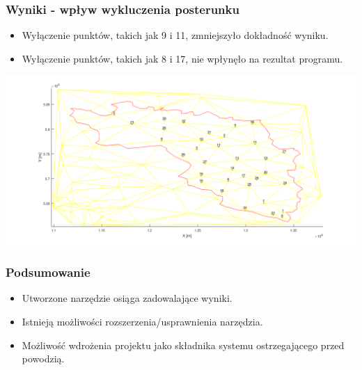 \documentclass{beamer}
\begin{document}
\begin{frame}
\frametitle{Wyniki - wpływ wykluczenia posterunku}
\begin{itemize}
\item{Wyłączenie punktów, takich jak 9 i 11, zmniejszyło dokładność wyniku.}
\item{Wyłączenie punktów, takich jak 8 i 17, nie wpłynęło na rezultat programu.}
\end{itemize}
\centering
\includegraphics[width=.8\textwidth]{./../img/identyfikatory_punktow.png}

\end{frame}


\begin{frame}
\frametitle{Podsumowanie}
\begin{itemize}
	\item{Utworzone narzędzie osiąga zadowalające wyniki.}
	\item{Istnieją możliwości rozszerzenia/usprawnienia narzędzia.}
	\item{Możliwość wdrożenia projektu jako składnika systemu ostrzegającego przed powodzią.}

\end{itemize}
\end{frame}
\end{document}
